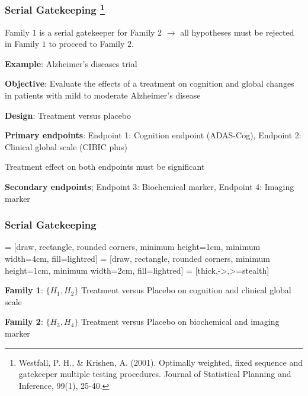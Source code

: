 \documentclass[xcolor={dvipsnames}]{beamer}
\newcommand{\rbf}[1]{\textcolor{redUnipd}{ #1}}
\begin{document}
\begin{frame}
\frametitle{Serial Gatekeeping \footnote{Westfall, P. H., & Krishen, A. (2001). Optimally weighted, fixed sequence and gatekeeper multiple testing procedures. Journal of Statistical Planning and Inference, 99(1), 25-40.}}

Family $1$ is a \rbf{serial gatekeeper} for Family $2$ $\rightarrow$ all hypotheses must be rejected in Family $1$ to proceed to Family $2$.

\bigskip
\rbf{\textbf{Example}}: Alzheimer's diseases trial

\textbf{Objective}: Evaluate the effects of a treatment on cognition
and global changes in patients with mild to moderate Alzheimer's disease

\textbf{Design}: Treatment versus placebo

\textbf{Primary endpoints}: Endpoint 1: Cognition endpoint (ADAS-Cog), Endpoint 2: Clinical global scale (CIBIC plus)

Treatment effect on both endpoints must be significant

\textbf{Secondary endpoints}; Endpoint 3: Biochemical marker, Endpoint 4: Imaging marker
\end{frame}

\begin{frame}
\frametitle{Serial Gatekeeping}
 = [draw, rectangle, rounded corners, minimum height=1cm, minimum width=4cm, fill=lightred]
 = [draw, rectangle, rounded corners, minimum height=1cm, minimum width=2cm, fill=lightred]
 = [thick,->,>=stealth]

\begin{figure}
\centering

\end{figure}
\textbf{Family 1}: $\{H_1, H_2\}$  Treatment versus Placebo on cognition and clinical global scale

\textbf{Family 2}: $\{H_3, H_4\}$  Treatment versus Placebo on biochemical and imaging marker
\end{frame}
\end{document}
